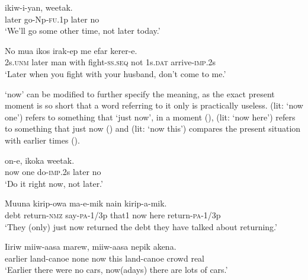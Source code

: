 \ea%
\label{ex:x476}
\gll {} ikiw-i-yan,  weetak. \\
later go-Np-\textsc{fu}.1p later no\\
\glt`We'll go some other time, not later today.'
\z

\ea%
\label{ex:x477}
\gll No  mua ikos irak-ep me efar kerer-e. \\
2s.\textsc{unm} later man with fight-\textsc{ss}.\textsc{seq} not 1s.\textsc{dat} arrive-\textsc{imp}.2s\\
\glt`Later when you fight with your husband, don't come to me.'
\z

 `now' can be modified to further specify the meaning, as the exact present moment is so short that a word referring to it only is practically useless.  (lit: `now one') refers to something that  `just now', in a moment (),  (lit: `now here') refers to something that  just now () and  (lit: `now this') compares the present situation with earlier times ().

\ea%
\label{ex:x478}
\gll {}  on-e, ikoka weetak. \\
now one do-\textsc{imp}.2s later no\\
\glt`Do it right now, not later.'
\z

\ea%
\label{ex:x479}
\gll Muuna kirip-owa ma-e-mik nain   kirip-a-mik. \\
debt return-\textsc{nmz} say-\textsc{pa}-1/3p that1 now here return-\textsc{pa}-1/3p\\
\glt`They (only) just now returned the debt they have talked about returning.'
\z

\ea%
\label{ex:x480}
\gll Iiriw miiw-aasa marew,   miiw-aasa nepik akena. \\
earlier land-canoe none now this land-canoe crowd real\\
\glt`Earlier there were no cars, now(adays) there are lots of cars.'
\z

